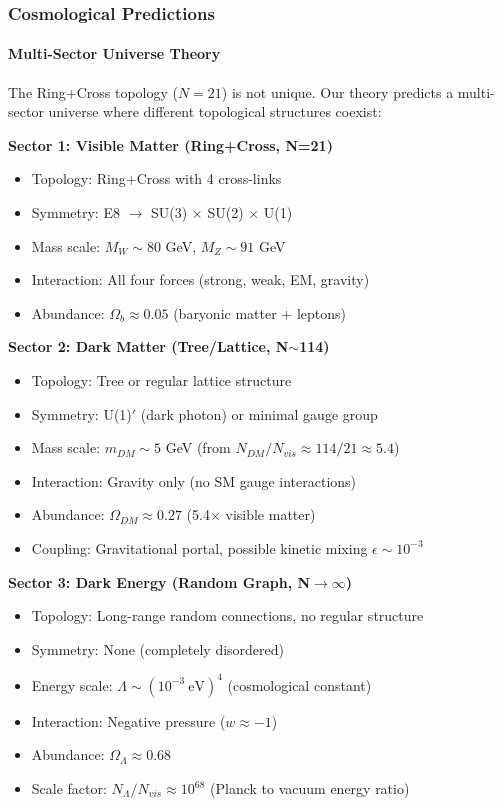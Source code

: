 \documentclass[12pt,a4paper]{article}
\begin{document}
\subsubsection{Cosmological Predictions}

\paragraph{Multi-Sector Universe Theory}

The Ring+Cross topology ($N=21$) is not unique. Our theory predicts a multi-sector universe where different topological structures coexist:

\textbf{Sector 1: Visible Matter (Ring+Cross, N=21)}
\begin{itemize}
\item Topology: Ring+Cross with 4 cross-links
\item Symmetry: E8 $\to$ SU(3) $\times$ SU(2) $\times$ U(1)
\item Mass scale: $M_W \sim 80$ GeV, $M_Z \sim 91$ GeV
\item Interaction: All four forces (strong, weak, EM, gravity)
\item Abundance: $\Omega_b \approx 0.05$ (baryonic matter + leptons)
\end{itemize}

\textbf{Sector 2: Dark Matter (Tree/Lattice, N$\sim$114)}
\begin{itemize}
\item Topology: Tree or regular lattice structure
\item Symmetry: U(1)$'$ (dark photon) or minimal gauge group
\item Mass scale: $m_{DM} \sim 5$ GeV (from $N_{DM}/N_{vis} \approx 114/21 \approx 5.4$)
\item Interaction: Gravity only (no SM gauge interactions)
\item Abundance: $\Omega_{DM} \approx 0.27$ (5.4$\times$ visible matter)
\item Coupling: Gravitational portal, possible kinetic mixing $\epsilon \sim 10^{-3}$
\end{itemize}

\textbf{Sector 3: Dark Energy (Random Graph, N$\to\infty$)}
\begin{itemize}
\item Topology: Long-range random connections, no regular structure
\item Symmetry: None (completely disordered)
\item Energy scale: $\Lambda \sim (10^{-3}\ \mathrm{eV})^4$ (cosmological constant)
\item Interaction: Negative pressure ($w \approx -1$)
\item Abundance: $\Omega_\Lambda \approx 0.68$
\item Scale factor: $N_\Lambda / N_{vis} \approx 10^{68}$ (Planck to vacuum energy ratio)
\end{itemize}
\end{document}
